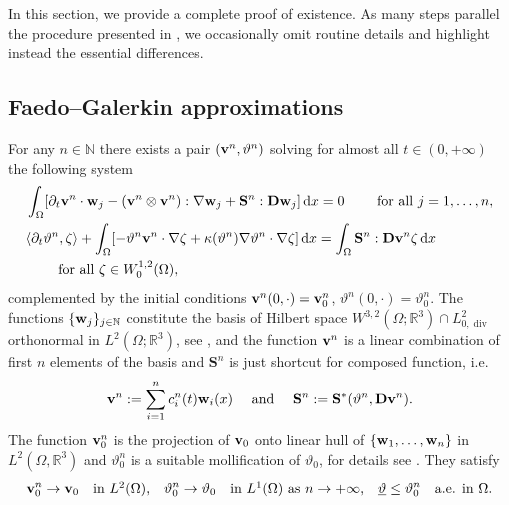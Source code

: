 \documentclass[11pt, a4paper, reqno]{amsart}
\newcommand{\N}{\mathbb N}
\newcommand{\R}{{\mathbb R}}
\newcommand{\dual}[2]{\langle #1,#2\rangle}
\numberwithin{equation}{section}
\newcommand{\diver}{\operatorname{div}}
\newcommand{\vc}[1]{{\bf #1}}
\newcommand{\vv}{\vc{v}}
\newcommand{\vw}{\vc{w}}
\newcommand{\thet}{\vartheta}
\renewcommand{\S}{\mathbf{S}}
\newcommand{\D}{\mathbf{D}}
\newcommand{\dx}{\,{\rm d} {x}}
\newcommand{\intO}[1]{\int_{\Omega} #1 \dx}
\newcommand{\tmin}{\underline{\thet}}
\begin{document}
In this section, we provide a complete proof of existence. As many steps parallel the procedure presented in \cite{ABK22}, we occasionally omit routine details and highlight instead the essential differences.


\subsection{Faedo--Galerkin approximations}
For any $n\in \N$ there exists a pair $(\vv^n, \thet^n)$ solving for almost all $t\in (0,+\infty)$ the following system
\begin{align}
\label{ode11}
&\intO{[\partial_t\vv^{n} \cdot \vw_j  - (\vv^{n} \otimes \vv^{n}): \nabla \vw_j + \S^{n}: \D\vw_j]} = 0 \qquad \mbox{ for all } j=1,\dots,n,
\\
\label{ode22}
&\begin{aligned}
&\dual{\partial_t\thet^{n}}{\zeta} +\intO{[-\thet^{n} \vv^{n} \cdot \nabla \zeta + \kappa(\thet^n)\nabla\thet^{n}\cdot \nabla \zeta]} = \intO{\S^{n}: \D\vv^{n} \zeta} \\
&\qquad \mbox{ for all }\zeta\in W_0^{1,2}(\Omega),
\end{aligned}
\end{align}
complemented by the initial conditions $\vv^n(0, \cdot)=\vv^n_0$, $\thet^n(0, \cdot)=\thet_0^n$. 
The functions $\{\vw_j\}_{j\in \N}$ constitute the basis of Hilbert space $W^{3,2}(\Omega; \R^3) \cap L^2_{0, \diver}$ orthonormal in $L^2(\Omega; \R^3)$,
 see \cite[Appendix~6.4]{mnrr1996}, and the function $\vv^n$ is a linear combination of first $n$ elements of the basis and $\S^n$ is just shortcut for composed function, i.e. 
\begin{equation}
  \vv^n:= \sum_{i=1}^n c^{n}_i(t)\vw_i(x) \quad \mbox{ and } \quad   \S^n:= \S^*(\thet^n, \D \vv^n).
  \end{equation}
The function $\vv^n_0$ is the projection of $\vv_0$ onto linear hull of $\{\vw_1,\dots,\vw_n\}$ in $L^2(\Omega,\R^3)$ and $\thet^n_0$ is a suitable mollification of $\thet_0$, for details see \cite[Appendix B, (B.2)-(B.3)]{BuFeMa2009}. They satisfy
\begin{equation}\label{conv:ic}
    \vv^n_0\to\vv_0\quad\mbox{in $L^2(\Omega)$,}\quad \thet_0^n\to\thet_0\quad\mbox{in $L^1(\Omega)$ as $n\to+\infty$,}\quad  \tmin\leq\thet_0^n\quad\mbox{a.e. in $\Omega$.}
\end{equation}
  
\end{document}
